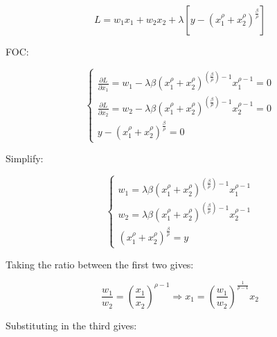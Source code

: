 \documentclass{article}
\begin{document}
$$L =  w_1x_1 + w_2x_2 + \lambda [y -  (x_1^\rho + x_2^\rho)^{\frac{\beta}{\rho}}] $$ 

FOC:

\begin{equation}
    \begin{cases}
\frac{\partial L}{\partial x_1} =w_1 - \lambda \beta (x_1^\rho + x_2^\rho)^{(\frac{\beta}{\rho}) - 1}x_1^{\rho - 1}= 0 \\
\frac{\partial L}{\partial x_2} =w_2 - \lambda \beta (x_1^\rho + x_2^\rho)^{(\frac{\beta}{\rho}) - 1}x_2^{\rho - 1} = 0 \\
y -  (x_1^\rho + x_2^\rho)^{\frac{\beta}{\rho}} = 0
    \end{cases}
    \nonumber
\end{equation}

Simplify:

\begin{equation}
    \begin{cases}
 w_1 = \lambda \beta (x_1^\rho + x_2^\rho)^{(\frac{\beta}{\rho}) - 1}x_1^{\rho - 1} \\
 w_2 =\lambda \beta (x_1^\rho + x_2^\rho)^{(\frac{\beta}{\rho}) - 1}x_2^{\rho - 1} \\
(x_1^\rho + x_2^\rho)^{\frac{\beta}{\rho}} = y
    \end{cases}
    \label{eq:3_49_foc}   
\end{equation}

Taking the ratio between the first two gives:

$$\frac{w_1}{w_2}= (\frac{x_1}{x_2})^{\rho - 1} \Rightarrow x_1 = (\frac{w_1}{w_2})^{\frac{1}{\rho - 1}} x_2$$

Substituting in the third gives:
\end{document}
